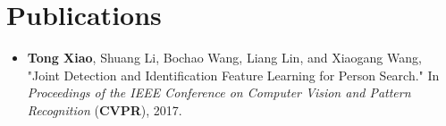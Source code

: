 \chapter*{Publications}

\begin{itemize}
  \item \textbf{Tong Xiao}, Shuang Li, Bochao Wang, Liang Lin, and Xiaogang Wang, "Joint Detection and Identification Feature Learning for Person Search." In \textit{Proceedings of the IEEE Conference on Computer Vision and Pattern Recognition} (\textbf{CVPR}), 2017.

\end{itemize}
